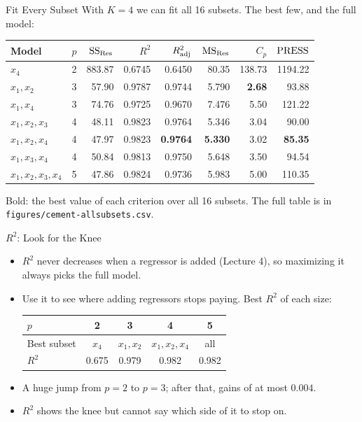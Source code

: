 \begin{frame}{Fit Every Subset}
    With $K=4$ we can fit all 16 subsets. The best few, and the full model:
    \begin{center}
        \footnotesize
        \setlength{\tabcolsep}{5pt}
        \begin{tabular}{lcrrrrrr}
            \toprule
            Model & $p$ & $\mathrm{SS}_{\mathrm{Res}}$ & $R^2$ & $R^2_{\mathrm{adj}}$ & $\mathrm{MS}_{\mathrm{Res}}$ & $C_p$ & $\mathrm{PRESS}$ \\
            \midrule
            $x_4$ & 2 & 883.87 & 0.6745 & 0.6450 & 80.35 & 138.73 & 1194.22 \\
            $x_1,x_2$ & 3 & 57.90 & 0.9787 & 0.9744 & 5.790 & \textbf{2.68} & 93.88 \\
            $x_1,x_4$ & 3 & 74.76 & 0.9725 & 0.9670 & 7.476 & 5.50 & 121.22 \\
            $x_1,x_2,x_3$ & 4 & 48.11 & 0.9823 & 0.9764 & 5.346 & 3.04 & 90.00 \\
            $x_1,x_2,x_4$ & 4 & 47.97 & 0.9823 & \textbf{0.9764} & \textbf{5.330} & 3.02 & \textbf{85.35} \\
            $x_1,x_3,x_4$ & 4 & 50.84 & 0.9813 & 0.9750 & 5.648 & 3.50 & 94.54 \\
            $x_1,x_2,x_3,x_4$ & 5 & 47.86 & 0.9824 & 0.9736 & 5.983 & 5.00 & 110.35 \\
            \bottomrule
        \end{tabular}
    \end{center}
    Bold: the best value of each criterion over all 16 subsets. The full table is in \texttt{figures/cement-allsubsets.csv}.
\end{frame}


\begin{frame}{$R^2$: Look for the Knee}
    \begin{itemize}
        \item $R^2$ never decreases when a regressor is added (Lecture 4), so maximizing it always picks the full model.
        \item Use it to see where adding regressors stops paying. Best $R^2$ of each size:
        \begin{center}
            \small
            \begin{tabular}{lcccc}
                \toprule
                $p$ & 2 & 3 & 4 & 5 \\
                \midrule
                Best subset & $x_4$ & $x_1,x_2$ & $x_1,x_2,x_4$ & all \\
                $R^2$ & 0.675 & 0.979 & 0.982 & 0.982 \\
                \bottomrule
            \end{tabular}
        \end{center}
        \item A huge jump from $p=2$ to $p=3$; after that, gains of at most $0.004$.
        \item $R^2$ shows the knee but cannot say which side of it to stop on.
    \end{itemize}
\end{frame}


